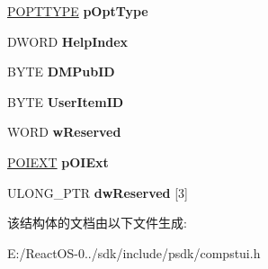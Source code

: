 \begin{DoxyCompactItemize}
\begin{tabbing}
\end{tabbing}\item 
\mbox{\label{struct___o_p_t_i_t_e_m_a9bea4a28397c82c0bfc04753a57a21c6}} 
\hyperlink{struct___o_p_t_t_y_p_e}{P\+O\+P\+T\+T\+Y\+PE} {\bfseries p\+Opt\+Type}
\item 
\mbox{\label{struct___o_p_t_i_t_e_m_a1e3d0afd0195605ce8e9c6f8471572a3}} 
D\+W\+O\+RD {\bfseries Help\+Index}
\item 
\mbox{\label{struct___o_p_t_i_t_e_m_a474288b63093f8410dd578a451e6d148}} 
B\+Y\+TE {\bfseries D\+M\+Pub\+ID}
\item 
\mbox{\label{struct___o_p_t_i_t_e_m_abece142cf8f5ddc83b65a589f3d49a7a}} 
B\+Y\+TE {\bfseries User\+Item\+ID}
\item 
\mbox{\label{struct___o_p_t_i_t_e_m_a27c2f90835dcea45cd228722f6f2adc2}} 
W\+O\+RD {\bfseries w\+Reserved}
\item 
\mbox{\label{struct___o_p_t_i_t_e_m_abfcc99348cd5b502a70d61328c79f541}} 
\hyperlink{struct___o_i_e_x_t}{P\+O\+I\+E\+XT} {\bfseries p\+O\+I\+Ext}
\item 
\mbox{\label{struct___o_p_t_i_t_e_m_a0ceba84cf8c17a477253d405d3dd96ac}} 
U\+L\+O\+N\+G\+\_\+\+P\+TR {\bfseries dw\+Reserved} \mbox{[}3\mbox{]}
\end{DoxyCompactItemize}


该结构体的文档由以下文件生成\+:\begin{DoxyCompactItemize}
\item 
E\+:/\+React\+O\+S-\/0../sdk/include/psdk/compstui.\+h\end{DoxyCompactItemize}
